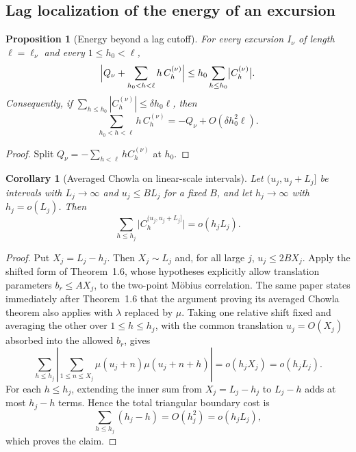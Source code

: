 \documentclass[11pt,reqno]{amsart}
\makeatletter
\let\CG@origcite\cite
\renewcommand*{\cite}[2][]{\def\CG@citekey{#2}%
  \ifx\relax#1\relax\CG@origcite{#2}\else\CG@origcite[#1]{#2}\fi}
\numberwithin{equation}{section}
\theoremstyle{plain}
\newtheorem{proposition}[theorem]{Proposition}
\newtheorem{corollary}[theorem]{Corollary}
\theoremstyle{definition}
\theoremstyle{remark}
\makeatother
\begin{document}
\subsection{Lag localization of the energy of an excursion}

\begin{proposition}[Energy beyond a lag cutoff]
\label{prop:lag-localization}
For every excursion $I_\nu$ of length $\ell=\ell_\nu$ and every
$1\le h_0<\ell$,
\begin{equation}
\Bigl|Q_\nu+\sum_{h_0<h<\ell}h\,C^{(\nu)}_h\Bigr|
\le h_0\sum_{h\le h_0}\bigl|C^{(\nu)}_h\bigr| .
\end{equation}
Consequently, if $\sum_{h\le h_0}|C^{(\nu)}_h|\le\delta h_0\ell$, then
\begin{equation}
\sum_{h_0<h<\ell}h\,C^{(\nu)}_h
=-Q_\nu+O(\delta h_0^2\ell).
\end{equation}
\end{proposition}

\begin{proof}
Split $Q_\nu=-\sum_{h<\ell}hC^{(\nu)}_h$ at $h_0$.
\end{proof}

\begin{corollary}[Averaged Chowla on linear-scale intervals]
\label{cor:chowla-linear}
Let $(u_j,u_j+L_j]$ be intervals with $L_j\to\infty$ and $u_j\le BL_j$ for a
fixed $B$, and let $h_j\to\infty$ with $h_j=o(L_j)$. Then
\begin{equation}
\sum_{h\le h_j}\bigl|C^{(u_j,u_j+L_j]}_h\bigr|=o(h_jL_j).
\end{equation}
\end{corollary}

\begin{proof}
Put $X_j=L_j-h_j$. Then $X_j\sim L_j$ and, for all large $j$,
$u_j\le2B X_j$. Apply the shifted form of
\cite[Theorem~1.6]{MRT15}, whose hypotheses explicitly allow translation
parameters $b_r\le A X_j$, to the two-point M\"obius correlation. The same
paper states immediately after Theorem~1.6 that the argument proving its
averaged Chowla theorem also applies with $\lambda$ replaced by $\mu$.
Taking one relative shift fixed and averaging the other over
$1\le h\le h_j$, with the common translation $u_j=O(X_j)$ absorbed into
the allowed $b_r$, gives
\begin{equation}
 \sum_{h\le h_j}\left|
 \sum_{1\le n\le X_j}\mu(u_j+n)\mu(u_j+n+h)
 \right|=o(h_jX_j)=o(h_jL_j).
\end{equation}
For each $h\le h_j$, extending the inner sum from $X_j=L_j-h_j$ to
$L_j-h$ adds at most $h_j-h$ terms. Hence the total triangular boundary
cost is
\begin{equation}
 \sum_{h\le h_j}(h_j-h)=O(h_j^2)=o(h_jL_j),
\end{equation}
which proves the claim.
\end{proof}
\end{document}
